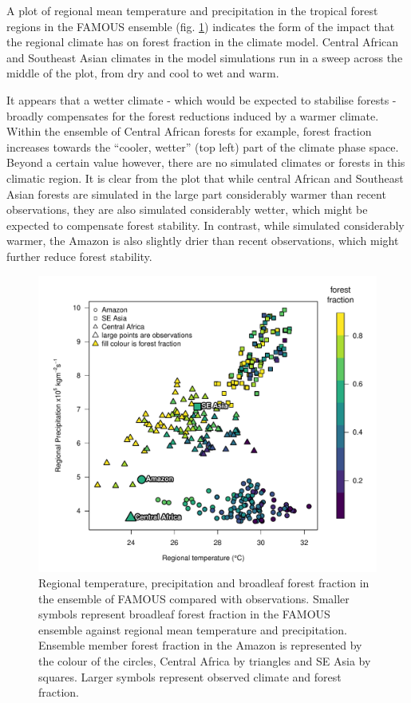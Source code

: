 \documentclass[gmd, manuscript]{copernicus}
\begin{document}
A plot of regional mean temperature and precipitation in the tropical forest regions in the FAMOUS ensemble (fig. \ref{fig:fraction_vs_temp_precip_pcolcor}) indicates the form of the impact that the regional climate has on forest fraction in the climate model. Central African and Southeast Asian climates in the model simulations run in a sweep across the middle of the plot, from dry and cool to wet and warm. 

It appears that a wetter climate - which would be expected to stabilise forests - broadly compensates for the forest reductions induced by a warmer climate. Within the ensemble of Central African forests for example, forest fraction increases towards the ``cooler, wetter'' (top left) part of the climate phase space. Beyond a certain value however, there are no simulated climates or forests in this climatic region. It is clear from the plot that while central African and Southeast Asian forests are simulated in the large part considerably warmer than recent observations, they are also simulated considerably wetter, which might be expected to compensate forest stability. In contrast, while simulated considerably warmer, the Amazon is also slightly drier than recent observations, which might further reduce forest stability.

\begin{figure}[t]
\includegraphics[width=12cm]{../graphics/fraction_vs_temp_precip_pcolcor.pdf}
\caption{Regional temperature, precipitation and broadleaf forest fraction in the ensemble of FAMOUS compared with observations. Smaller symbols represent broadleaf forest fraction in the FAMOUS ensemble against regional mean temperature and precipitation. Ensemble member forest fraction in the Amazon is represented by the colour of the circles, Central Africa by triangles and SE Asia by squares. Larger symbols represent observed climate and forest fraction.
}
\label{fig:fraction_vs_temp_precip_pcolcor}
\end{figure}
\end{document}
